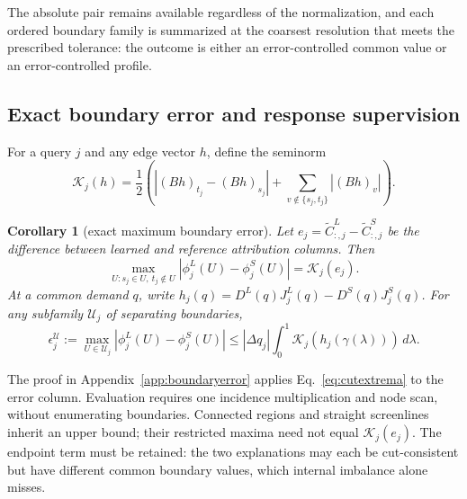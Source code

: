 \documentclass[a4paper,fleqn]{cas-sc}
\newtheorem{corollary}[theorem]{Corollary}
\begin{document}
\medskip
\noindent{}
\medskip

\noindent The absolute pair remains available regardless of the
normalization, and each ordered boundary family is summarized at the
coarsest resolution that meets the prescribed tolerance: the outcome is
either an error-controlled common value or an error-controlled
profile.



\subsection{Exact boundary error and response supervision}\label{sec:boundarylearning}
For a query $j$ and any edge vector $h$, define the seminorm
\begin{equation}
\mathcal K_j(h)=\frac12\left(\left|(Bh)_{t_j}-(Bh)_{s_j}\right|
+\sum_{v\notin\{s_j,t_j\}}|(Bh)_v|\right).
\label{eq:boundaryseminorm}
\end{equation}
\begin{corollary}[exact maximum boundary error]\label{cor:boundaryerror}
Let $e_j=\widetilde C^L_{:,j}-\widetilde C^S_{:,j}$ be the difference
between learned and reference attribution columns. Then
\begin{equation}
\max_{U:s_j\in U,\ t_j\notin U}|\phi_j^L(U)-\phi_j^S(U)|
=\mathcal K_j(e_j).\label{eq:exactboundaryerror}
\end{equation}
At a common demand $q$, write
$h_j(q)=D^L(q)J_j^L(q)-D^S(q)J_j^S(q)$.
For any subfamily $\mathcal U_j$ of separating boundaries,
\begin{equation}
\epsilon_j^{\mathcal U}:=\max_{U\in\mathcal U_j}|\phi_j^L(U)-\phi_j^S(U)|
\le |\Delta q_j|\int_0^1\mathcal K_j(h_j(\gamma(\lambda)))\,d\lambda.
\label{eq:localboundarybound}
\end{equation}
\end{corollary}
The proof in Appendix~\ref{app:boundaryerror} applies
Eq.~\eqref{eq:cutextrema} to the error column. Evaluation requires one
incidence multiplication and node scan, without enumerating boundaries.
Connected regions and straight screenlines inherit an upper bound; their
restricted maxima need not equal $\mathcal K_j(e_j)$. The endpoint term
must be retained: the two explanations may each be cut-consistent but
have different common boundary values, which internal imbalance alone misses.
\end{document}
